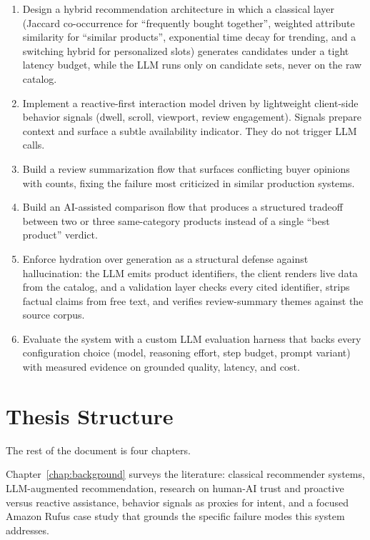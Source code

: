 \begin{enumerate}
  \item Design a hybrid recommendation architecture in which a
    classical layer (Jaccard co-occurrence for ``frequently
      bought together'', weighted attribute similarity for
      ``similar products'', exponential time decay for trending,
    and a switching hybrid for personalized slots) generates
    candidates under a tight latency budget, while the LLM runs
    only on candidate sets, never on the raw catalog.

  \item Implement a reactive-first interaction model driven by
    lightweight client-side behavior signals (dwell, scroll,
    viewport, review engagement). Signals prepare context and
    surface a subtle availability indicator. They do not trigger
    LLM calls.

  \item Build a review summarization flow that surfaces
    conflicting buyer opinions with counts, fixing the failure
    most criticized in similar production systems.

  \item Build an AI-assisted comparison flow that produces a
    structured tradeoff between two or three same-category
    products instead of a single ``best product'' verdict.

  \item Enforce hydration over generation as a structural defense
    against hallucination: the LLM emits product identifiers, the
    client renders live data from the catalog, and a validation
    layer checks every cited identifier, strips factual claims
    from free text, and verifies review-summary themes against
    the source corpus.

  \item Evaluate the system with a custom LLM evaluation harness
    that backs every configuration choice (model, reasoning
    effort, step budget, prompt variant) with measured evidence
    on grounded quality, latency, and cost.
\end{enumerate}

\section{Thesis Structure}
\label{sec:intro-structure}

The rest of the document is four chapters.

Chapter~\ref{chap:background} surveys the literature: classical
recommender systems, LLM-augmented recommendation, research on
human-AI trust and proactive versus reactive assistance, behavior
signals as proxies for intent, and a focused Amazon Rufus case
study that grounds the specific failure modes this system
addresses.


